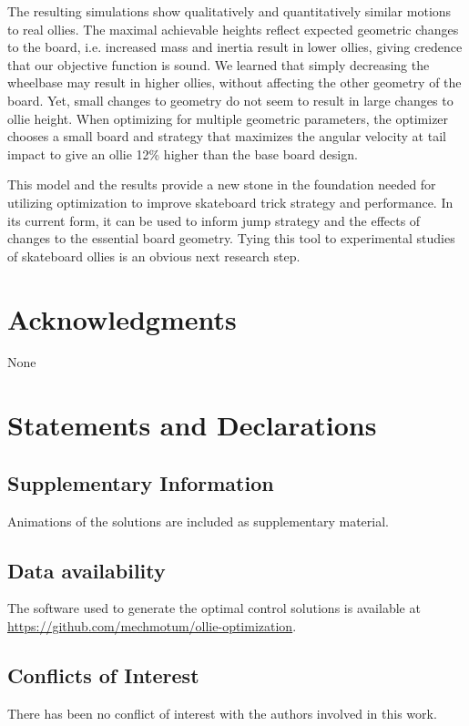 \documentclass[default,iicol]{sn-jnl}
\begin{document}
The resulting simulations show qualitatively and quantitatively similar motions to real ollies. The maximal achievable heights reflect expected geometric changes to the board, i.e. increased mass and inertia result in lower ollies, giving credence that our objective function is sound. We learned that simply decreasing the wheelbase may result in higher ollies, without affecting the other geometry of the board. Yet, small changes to geometry do not seem to result in large changes to ollie height. When optimizing for multiple geometric parameters, the optimizer chooses a small board and strategy that maximizes the angular velocity at tail impact to give an ollie 12\% higher than the base board design.

This model and the results provide a new stone in the foundation needed for utilizing optimization to improve skateboard trick strategy and performance. In its current form, it can be used to inform jump strategy and the effects of changes to the essential board geometry. Tying this tool to experimental studies of skateboard ollies is an obvious next research step.

\section{Acknowledgments}
None

\section{Statements and Declarations}

\subsection{Supplementary Information}

Animations of the solutions are included as supplementary material.

\subsection{Data availability}

The software used to generate the optimal control solutions is available at \url{https://github.com/mechmotum/ollie-optimization}.

\subsection{Conflicts of Interest}

There has been no conflict of interest with the authors involved in this work.



\end{document}
